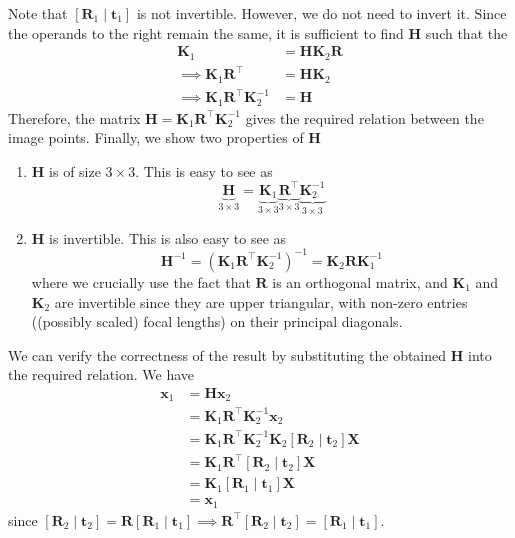 \documentclass[10pt]{article}
\newcommand{\orientation}[1]{\left[ \mathbf{R}_{#1} \mid \mathbf{t}_{#1} \right]}
\begin{document}
    Note that $\orientation{1}$ is not invertible. However, we do not need to invert it. Since the
    operands to the right remain the same, it is sufficient to find $\mathbf{H}$ such that the
    \begin{align*}
        \mathbf{K}_{1} &= \mathbf{H} \mathbf{K}_{2} \mathbf{R} \\
        \implies \mathbf{K}_{1} \mathbf{R}^{\top} &= \mathbf{H} \mathbf{K}_{2} \\
        \implies \mathbf{K}_{1} \mathbf{R}^{\top} \mathbf{K}_{2}^{-1} &= \mathbf{H}
    \end{align*}
    Therefore, the matrix $\mathbf{H} = \mathbf{K}_{1} \mathbf{R}^{\top} \mathbf{K}_{2}^{-1}$ gives the
    required relation between the image points. Finally, we show two properties of $\mathbf{H}$
    \begin{enumerate}
        \item $\mathbf{H}$ is of size $3 \times 3$. This is easy to see as
        \begin{equation*}
            \underbrace{\mathbf{H}}_{3 \times 3} = \underbrace{\mathbf{K}_{1}}_{3 \times 3}
            \underbrace{\mathbf{R}^{\top}}_{3 \times 3} \underbrace{\mathbf{K}_{2}^{-1}}_{3 \times 3}
        \end{equation*}

        \item $\mathbf{H}$ is invertible. This is also easy to see as
        \begin{equation*}
            \mathbf{H}^{-1} = \left( \mathbf{K}_{1} \mathbf{R}^{\top} \mathbf{K}_{2}^{-1} \right)^{-1}
            = \mathbf{K}_{2} \mathbf{R} \mathbf{K}_{1}^{-1}
        \end{equation*}
        where we crucially use the fact that $\mathbf{R}$ is an orthogonal matrix, and $\mathbf{K}_{1}$
        and $\mathbf{K}_{2}$ are invertible since they are upper triangular, with non-zero
        entries ((possibly scaled) focal lengths) on their principal diagonals.
    \end{enumerate}
    We can verify the correctness of the result by substituting the obtained $\mathbf{H}$ into the
    required relation. We have
    \begin{align*}
        \mathbf{x}_{1} &= \mathbf{H} \mathbf{x}_{2} \\
        &= \mathbf{K}_{1} \mathbf{R}^{\top} \mathbf{K}_{2}^{-1} \mathbf{x}_{2} \\
        &= \mathbf{K}_{1} \mathbf{R}^{\top} \mathbf{K}_{2}^{-1} \mathbf{K}_{2} \orientation{2} \mathbf{X} \\
        &= \mathbf{K}_{1} \mathbf{R}^{\top} \orientation{2} \mathbf{X} \\
        &= \mathbf{K}_{1} \orientation{1} \mathbf{X} \\
        &= \mathbf{x}_{1}
    \end{align*}
    since $\orientation{2} = \mathbf{R} \orientation{1} \implies \mathbf{R}^{\top} \orientation{2} = \orientation{1}$.
\end{document}
